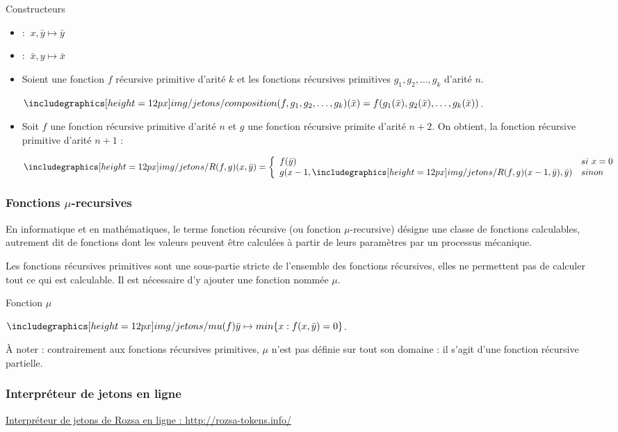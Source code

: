 \begin{definition}{Constructeurs}
\begin{itemize}
\item \Left : $~x, \bar{y} \mapsto \bar{y}$
\item \Right : $~\bar{x}, y \mapsto \bar{x}$
\item Soient une fonction $f$ récursive primitive d'arité $k$ et les fonctions récursives primitives $g_1,g_2,\ldots,g_k$ d'arité $n$. \par $\Composition(f,g_1,g_2,\ldots,g_k)(\bar{x}) = f(g_1(\bar{x}),g_2(\bar{x}),\ldots,g_k(\bar{x}))$.
\item Soit $f$ une fonction récursive primitive d'arité $n$ et $g$ une fonction récursive primite d'arité $n+2$. On obtient, la fonction récursive primitive d'arité $n+1$ :
\par $\Recurse(f,g)(x, \bar{y}) = \left\{
	\begin{array}{ll}
		f(\bar{y}) & si ~x = 0 \\
		g(x-1,\Recurse(f,g)(x-1, \bar{y}),\bar{y}) & sinon
	\end{array} \right.
	$
\end{itemize}
\end{definition}

	\subsubsection{Fonctions $\mu$-recursives}
	
\begin{definition}
En informatique et en mathématiques, le terme fonction récursive (ou fonction $\mu$-recursive) désigne une classe de fonctions calculables, autrement dit de fonctions dont les valeurs peuvent être calculées à partir de leurs paramètres par un processus mécanique.
\par Les fonctions récursives primitives sont une sous-partie stricte de l'ensemble des fonctions récursives, elles ne permettent pas de calculer tout ce qui est calculable. Il est nécessaire d'y ajouter une fonction nommée $\mu$.
\end{definition}

\begin{definition}{Fonction $\mu$}
\par $\Mu(f) \bar{y} \mapsto min\{x : f(x,\bar{y}) = 0\}$.
\par À noter : contrairement aux fonctions récursives primitives, $\mu$ n'est pas définie sur tout son domaine : il s'agit d'une fonction récursive partielle.
\end{definition}

	\subsubsection{Interpréteur de jetons en ligne}

\href{http://rozsa-tokens.info/}{Interpréteur de jetons de Rozsa en ligne : http://rozsa-tokens.info/}

